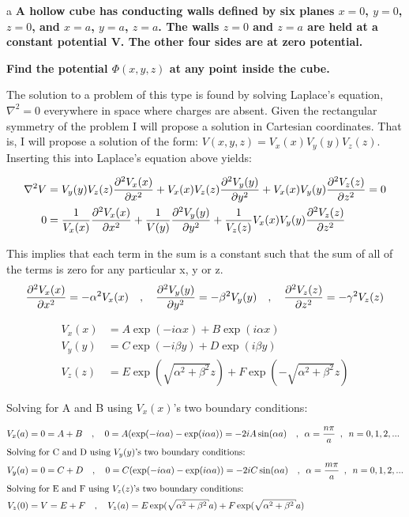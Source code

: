 \begin{homeworkProblem}

\begin{homeworkSection}{a}
\textbf{A hollow cube has conducting walls defined by six planes $x = 0$, $y = 0$, $z = 0$, and 
$x = a$, $y = a$, $z = a$. The walls $z = 0$ and $z = a$ are held at a constant potential V. 
The other four sides are at zero potential.}

\textbf{Find the potential $\Phi(x, y, z)$ at any point inside the cube.}

The solution to a problem of this type is found by solving Laplace's equation, $\nabla^2 = 0$ everywhere in space where charges are absent. Given the rectangular symmetry of the problem I will propose a solution in Cartesian coordinates. That is, I will propose a solution of the form: $V(x,y,z) = V_x(x)V_y(y)V_z(z)$. Inserting this into Laplace's equation above yields:
\begin{center}
\begin{align}
\nabla^2 V &= V_y(y)V_z(z)\dfrac{\partial^2 {V_x(x)}}{\partial {x}^2} + V_x(x)V_z(z)\dfrac{\partial^2 {V_y(y)}}{\partial {y}^2} + V_x(x)V_y(y)\dfrac{\partial^2 {V_z(z)}}{\partial {z}^2} = 0 \nonumber \\
0 &= \dfrac{1}{V_x(x)}\dfrac{\partial^2 {V_x(x)}}{\partial {x}^2} + \dfrac{1}{V(y)}\dfrac{\partial^2 {V_y(y)}}{\partial {y}^2} + \dfrac{1}{V_z(z)}V_x(x)V_y(y)\dfrac{\partial^2 {V_z(z)}}{\partial {z}^2} \nonumber
\end{align}

This implies that each term in the sum is a constant such that the sum of all of the terms is zero for any particular x, y or z.
\[
\dfrac{\partial^2 {V_x(x)}}{\partial {x}^2} = -\alpha^2 V_x(x) \quad,\quad \dfrac{\partial^2 {V_y(y)}}{\partial {y}^2} = -\beta^2 V_y(y) \quad,\quad \dfrac{\partial^2 {V_z(z)}}{\partial {z}^2} = -\gamma^2 V_z(z) \nonumber
\]

\begin{align}
V_x(x) &= A \exp(-i \alpha x) + B \exp(i \alpha x) \nonumber \\
V_y(y) &= C \exp(-i \beta y) + D \exp(i \beta y) \nonumber \\
V_z(z) &= E \exp(\sqrt{\alpha^2+\beta^2} z) + F \exp(-\sqrt{\alpha^2+\beta^2} z) \nonumber
\end{align}

Solving for A and B using $V_x(x)$'s two boundary conditions:

\begin{align}
V_x(a) &= 0 = A + B \quad,\quad 0 = A (\exp(-i \alpha a) - \exp(i \alpha a)) = -2iA \sin(\alpha a) \quad,\enskip \alpha = \frac{n\pi}{a}\enskip,\enskip n=0,1,2,... \nonumber \\
\intertext{Solving for C and D using $V_y(y)$'s two boundary conditions:} \nonumber 
V_y(a) &= 0 = C + D \quad,\quad 0 = C (\exp(-i \alpha a) - \exp(i \alpha a)) = -2iC \sin(\alpha a) \quad,\enskip \alpha = \frac{m\pi}{a}\enskip,\enskip n=0,1,2,... \nonumber \\
\intertext{Solving for E and F using $V_z(z)$'s two boundary conditions:} \nonumber 
V_z(0) &= V = E + F \quad,\quad V_z(a) = E \exp(\sqrt{\alpha^2+\beta^2} a) + F \exp(\sqrt{\alpha^2+\beta^2} a) \nonumber
\end{align}


\end{center}
\end{homeworkSection}
\end{homeworkProblem}
